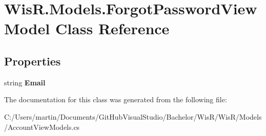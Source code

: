 \hypertarget{class_wis_r_1_1_models_1_1_forgot_password_view_model}{}\section{Wis\+R.\+Models.\+Forgot\+Password\+View\+Model Class Reference}
\label{class_wis_r_1_1_models_1_1_forgot_password_view_model}
\subsection*{Properties}
\begin{DoxyCompactItemize}
\item 
\hypertarget{class_wis_r_1_1_models_1_1_forgot_password_view_model_a39ada5da5b362acafcd774b378f1ec3b}{}string {\bfseries Email}\label{class_wis_r_1_1_models_1_1_forgot_password_view_model_a39ada5da5b362acafcd774b378f1ec3b}

\end{DoxyCompactItemize}


The documentation for this class was generated from the following file\+:\begin{DoxyCompactItemize}
\item 
C\+:/\+Users/martin/\+Documents/\+Git\+Hub\+Visual\+Studio/\+Bachelor/\+Wis\+R/\+Wis\+R/\+Models/Account\+View\+Models.\+cs\end{DoxyCompactItemize}
